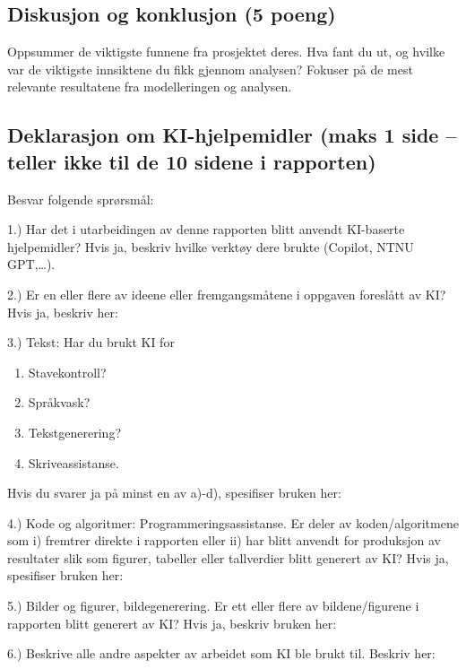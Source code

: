 \documentclass[]{article}
\providecommand{\tightlist}{%
  \setlength{\itemsep}{0pt}\setlength{\parskip}{0pt}}
\begin{document}
\subsection{Diskusjon og konklusjon (5
poeng)}\label{diskusjon-og-konklusjon-5-poeng}

Oppsummer de viktigste funnene fra prosjektet deres. Hva fant du ut, og
hvilke var de viktigste innsiktene du fikk gjennom analysen? Fokuser på
de mest relevante resultatene fra modelleringen og analysen.

\newpage

\subsection{Deklarasjon om KI-hjelpemidler (maks 1 side -- teller ikke
til de 10 sidene i
rapporten)}\label{deklarasjon-om-ki-hjelpemidler-maks-1-side-teller-ikke-til-de-10-sidene-i-rapporten}

Besvar folgende sprørsmål:

1.) Har det i utarbeidingen av denne rapporten blitt anvendt KI-baserte
hjelpemidler? Hvis ja, beskriv hvilke verktøy dere brukte (Copilot, NTNU
GPT,\ldots).

2.) Er en eller flere av ideene eller fremgangsmåtene i oppgaven
foreslått av KI? Hvis ja, beskriv her:

3.) Tekst: Har du brukt KI for

\begin{enumerate}
\def\labelenumi{\alph{enumi})}
\tightlist
\item
  Stavekontroll?
\item
  Språkvask?
\item
  Tekstgenerering?
\item
  Skriveassistanse.
\end{enumerate}

Hvis du svarer ja på minst en av a)-d), spesifiser bruken her:

4.) Kode og algoritmer: Programmeringsassistanse. Er deler av
koden/algoritmene som i) fremtrer direkte i rapporten eller ii) har
blitt anvendt for produksjon av resultater slik som figurer, tabeller
eller tallverdier blitt generert av KI? Hvis ja, spesifiser bruken her:

5.) Bilder og figurer, bildegenerering. Er ett eller flere av
bildene/figurene i rapporten blitt generert av KI? Hvis ja, beskriv
bruken her:

6.) Beskrive alle andre aspekter av arbeidet som KI ble brukt til.
Beskriv her:
\end{document}
